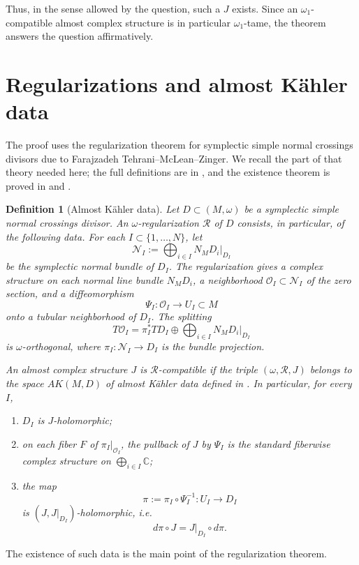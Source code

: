 \documentclass[11pt]{article}
\newtheorem{definition}{Definition}
\theoremstyle{remark}
\begin{document}
Thus, in the sense allowed by the question, such a $J$ exists. Since an $\omega_1$-compatible almost complex structure is in particular $\omega_1$-tame, the theorem answers the question affirmatively.

\section{Regularizations and almost K\"ahler data}

The proof uses the regularization theorem for symplectic simple normal crossings divisors due to Farajzadeh Tehrani--McLean--Zinger. We recall the part of that theory needed here; the full definitions are in \cite{TMZ21}, and the existence theorem is proved in \cite{TMZ18} and \cite{NSF}.

\begin{definition}[Almost K\"ahler data]\label{def:AK}
Let $D\subset(M,\omega)$ be a symplectic simple normal crossings divisor. An \emph{$\omega$-regularization} $\mathcal R$ of $D$ consists, in particular, of the following data. For each $I\subset\{1,\dots,N\}$, let
\[
\mathcal N_I:=\bigoplus_{i\in I}N_MD_i\big|_{D_I}
\]
be the symplectic normal bundle of $D_I$. The regularization gives a complex structure on each normal line bundle $N_MD_i$, a neighborhood $\mathcal O_I\subset\mathcal N_I$ of the zero section, and a diffeomorphism
\[
\Psi_I:\mathcal O_I\to U_I\subset M
\]
onto a tubular neighborhood of $D_I$. The splitting
\[
T\mathcal O_I=\pi_I^*TD_I\oplus \bigoplus_{i\in I}N_MD_i\big|_{D_I}
\]
is $\omega$-orthogonal, where $\pi_I:\mathcal N_I\to D_I$ is the bundle projection.

An almost complex structure $J$ is \emph{$\mathcal R$-compatible} if the triple $(\omega,\mathcal R,J)$ belongs to the space $AK(M,D)$ of almost K\"ahler data defined in \cite{TMZ18}. In particular, for every $I$,
\begin{enumerate}
\item $D_I$ is $J$-holomorphic;
\item on each fiber $F$ of $\pi_I\big|_{\mathcal O_I}$, the pullback of $J$ by $\Psi_I$ is the standard fiberwise complex structure on $\bigoplus_{i\in I}\mathbb C$;
\item the map
\[
\pi:=\pi_I\circ \Psi_I^{-1}:U_I\to D_I
\]
is $(J,J|_{D_I})$-holomorphic, i.e.
\[
d\pi\circ J=J|_{D_I}\circ d\pi.
\]
\end{enumerate}
\end{definition}

The existence of such data is the main point of the regularization theorem.
\end{document}
